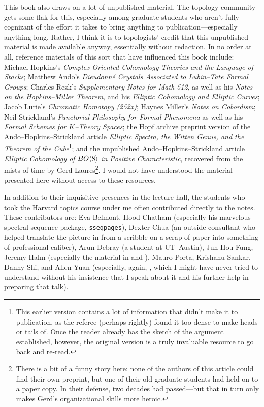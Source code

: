 This book also draws on a lot of unpublished material.  The topology community gets some flak for this, especially among graduate students who aren't fully cognizant of the effort it takes to bring anything to publication---especially anything long.  Rather, I think it is to topologists' credit that this unpublished material is made available anyway, essentially without redaction.  In no order at all, reference materials of this sort that have influenced this book include: Michael Hopkins's \textit{Complex Oriented Cohomology Theories and the Language of Stacks}; Matthew Ando's \textit{Dieudonn\'e Crystals Associated to Lubin--Tate Formal Groups}; Charles Rezk's \textit{Supplementary Notes for Math 512}, as well as his \textit{Notes on the Hopkins--Miller Theorem}, and his \textit{Elliptic Cohomology and Elliptic Curves}; Jacob Lurie's \textit{Chromatic Homotopy (252x)}; Haynes Miller's \textit{Notes on Cobordism}; Neil Strickland's \textit{Functorial Philosophy for Formal Phenomena} as well as his \textit{Formal Schemes for $K$--Theory Spaces}; the Hopf archive preprint version of the Ando--Hopkins--Strickland article \textit{Elliptic Spectra, the Witten Genus, and the Theorem of the Cube}\footnote{This earlier version contains a lot of information that didn't make it to publication, as the referee (perhaps rightly) found it too dense to make heads or tails of.  Once the reader already has the sketch of the argument established, however, the original version is a truly invaluable resource to go back and re-read.}; and the unpublished Ando--Hopkins--Strickland article \textit{Elliptic Cohomology of $BO\langle8\rangle$ in Positive Characteristic}, recovered from the mists of time by Gerd Laures\footnote{There is a bit of a funny story here: none of the authors of this article could find their own preprint, but one of their old graduate students had held on to a paper copy.  In their defense, two decades had passed---but that in turn only makes Gerd's organizational skills more heroic.}.  I would not have understood the material presented here without access to these resources.

In addition to their inquisitive presences in the lecture hall, the students who took the Harvard topics course under me often contributed directly to the notes.  These contributors are: Eva Belmont, Hood Chatham (especially his marvelous spectral sequence package, \texttt{sseqpages}), Dexter Chua (an outside consultant who helped translate the picture in  from a scribble on a scrap of paper into something of professional caliber), Arun Debray (a student at UT--Austin), Jun Hou Fung, Jeremy Hahn (especially the material in  and ), Mauro Porta, Krishanu Sankar, Danny Shi, and Allen Yuan (especially, again, , which I might have never tried to understand without his insistence that I speak about it and his further help in preparing that talk).


